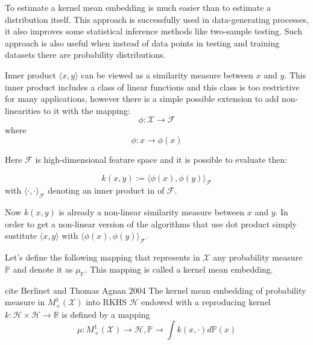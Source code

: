 To estimate a kernel mean embedding is much easier than to estimate a distribution itself. This approach is successfully used in data-generating processes, it also improves some statistical inference methods like two-sample testing. Such approach is also useful when instead of data points in testing and training datasets there are probability distributions. 

Inner product $\langle x, y \rangle$ can be viewed as a similarity measure between $x$ and $y$. This inner product includes a class of linear functions and this class is too restrictive for many applications, however there is a simple possible extension to add non-linearities to it with the mapping: \begin{equation}
    \phi: \mathcal{X} \rightarrow \mathcal{F}
\end{equation} where \begin{equation}
    \phi: x \rightarrow \phi(x)
    \label{equation:positive-definite}
\end{equation}

Here $\mathcal{F}$ is high-dimensional feature space and it is possible to evaluate then:

\begin{equation}
    k(x, y) := {\langle\phi(x), \phi(y)\rangle}_{\mathcal{F}}
\end{equation} with  ${\langle \cdot, \cdot \rangle}_{\mathcal{F}}$ denoting an inner product in of $\mathcal{F}$.

Now $ k(x, y)$ is already a non-linear similarity measure between $x$ and $y$. In order to get a non-linear version of the algorithms that use dot product simply sustitute $\langle x, y\rangle$ with $ {\langle\phi(x), \phi(y)\rangle}_{\mathcal{F}}$. 

Let's define the following mapping that represents in $\mathcal{X}$ any probability measure $\mathds{P}$ and denote it as $\mu_{\mathds{P}}$. This mapping is called a kernel mean embedding.

\begin{definition}
    cite Berlinet and Thomas Agnan 2004
    The kernel mean embedding of probability measure in $M^1_+(\mathcal{X})$ into RKHS $\mathscr{H}$ endowed with a reproducing kernel $k: \mathscr{H} \times \mathscr{H} \rightarrow \mathds{R}$ is defined by a mapping 
    \begin{equation}
        \mu : M^1_+(\mathcal{X}) \rightarrow \mathscr{H}, \mathds{P} \rightarrow \int k(x, \cdot)d\mathds{P}(x)
    \end{equation}
\end{definition}

